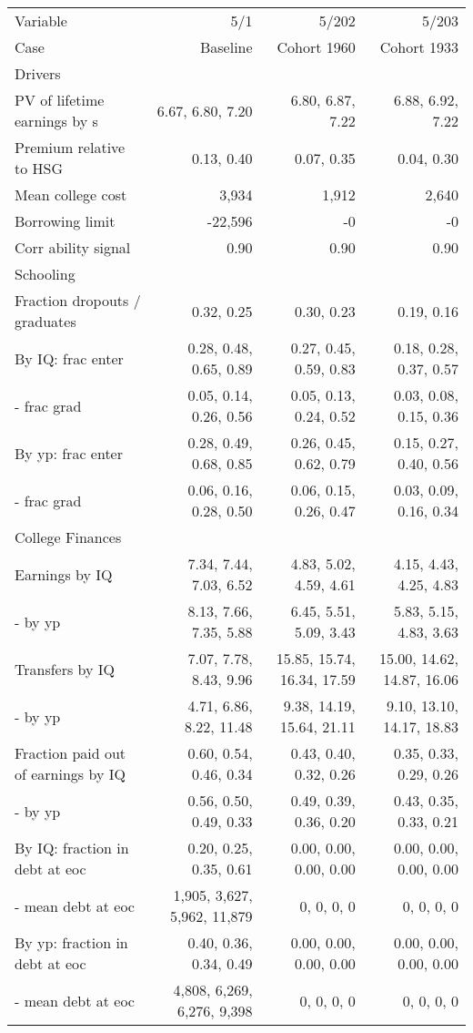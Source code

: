 \begin{tabular}{lrrr}
\hline
Variable & 5/1  & 5/202  & 5/203  \\ 
Case & Baseline  & Cohort 1960  & Cohort 1933  \\ 
Drivers &   &   &   \\ 
PV of lifetime earnings by s & 6.67, 6.80, 7.20  & 6.80, 6.87, 7.22  & 6.88, 6.92, 7.22  \\ 
Premium relative to HSG & 0.13, 0.40  & 0.07, 0.35  & 0.04, 0.30  \\ 
Mean college cost & 3,934  & 1,912  & 2,640  \\ 
Borrowing limit & -22,596  & -0  & -0  \\ 
Corr ability signal & 0.90  & 0.90  & 0.90  \\ 
\hline
Schooling &   &   &   \\ 
Fraction dropouts / graduates & 0.32, 0.25  & 0.30, 0.23  & 0.19, 0.16  \\ 
By IQ: frac enter & 0.28, 0.48, 0.65, 0.89  & 0.27, 0.45, 0.59, 0.83  & 0.18, 0.28, 0.37, 0.57  \\ 
- frac grad & 0.05, 0.14, 0.26, 0.56  & 0.05, 0.13, 0.24, 0.52  & 0.03, 0.08, 0.15, 0.36  \\ 
By yp: frac enter & 0.28, 0.49, 0.68, 0.85  & 0.26, 0.45, 0.62, 0.79  & 0.15, 0.27, 0.40, 0.56  \\ 
- frac grad & 0.06, 0.16, 0.28, 0.50  & 0.06, 0.15, 0.26, 0.47  & 0.03, 0.09, 0.16, 0.34  \\ 
\hline
College Finances &   &   &   \\ 
Earnings by IQ & 7.34, 7.44, 7.03, 6.52  & 4.83, 5.02, 4.59, 4.61  & 4.15, 4.43, 4.25, 4.83  \\ 
- by yp & 8.13, 7.66, 7.35, 5.88  & 6.45, 5.51, 5.09, 3.43  & 5.83, 5.15, 4.83, 3.63  \\ 
Transfers by IQ & 7.07, 7.78, 8.43, 9.96  & 15.85, 15.74, 16.34, 17.59  & 15.00, 14.62, 14.87, 16.06  \\ 
- by yp & 4.71, 6.86, 8.22, 11.48  & 9.38, 14.19, 15.64, 21.11  & 9.10, 13.10, 14.17, 18.83  \\ 
Fraction paid out of earnings by IQ & 0.60, 0.54, 0.46, 0.34  & 0.43, 0.40, 0.32, 0.26  & 0.35, 0.33, 0.29, 0.26  \\ 
- by yp & 0.56, 0.50, 0.49, 0.33  & 0.49, 0.39, 0.36, 0.20  & 0.43, 0.35, 0.33, 0.21  \\ 
By IQ: fraction in debt at eoc & 0.20, 0.25, 0.35, 0.61  & 0.00, 0.00, 0.00, 0.00  & 0.00, 0.00, 0.00, 0.00  \\ 
- mean debt at eoc & 1,905, 3,627, 5,962, 11,879  & 0, 0, 0, 0  & 0, 0, 0, 0  \\ 
By yp: fraction in debt at eoc & 0.40, 0.36, 0.34, 0.49  & 0.00, 0.00, 0.00, 0.00  & 0.00, 0.00, 0.00, 0.00  \\ 
- mean debt at eoc & 4,808, 6,269, 6,276, 9,398  & 0, 0, 0, 0  & 0, 0, 0, 0  \\ 
\hline
\end{tabular}%
